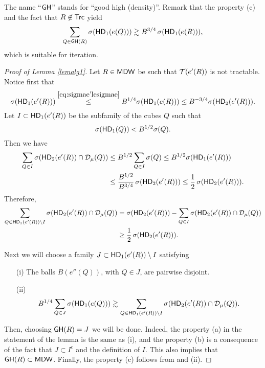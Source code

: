 The name ``${\mathsf{GH}}$'' stands for ``good high (density)''. Remark that the property (c) and the fact that $R\not\in{\mathsf{Trc}}$ yield
\begin{equation}\label{eqiter582}
\sum_{Q\in{\mathsf{GH}}(R)} \sigma({\mathsf{HD}}_1(e(Q))) \gtrsim B^{3/4}\,\sigma({\mathsf{HD}}_1(e(R))),
\end{equation}
which is suitable for iteration.

\begin{proof}[Proof of Lemma \ref{lemalg1}]
Let $R\in{\mathsf{MDW}}$ be such that ${\mathcal T}(e'(R))$ is not tractable. Notice first that
$$\sigma({\mathsf{HD}}_1(e'(R)))\overset{\eqref{eq:sigmae'lesigmae}}{\leq} B^{1/4}
\sigma({\mathsf{HD}}_1(e(R)))\leq B^{-3/4}\sigma({\mathsf{HD}}_2(e'(R))) .$$
Let $I\subset {\mathsf{HD}}_1(e'(R))$ be the subfamily of the cubes $Q$ such that
$$\sigma({\mathsf{HD}}_1(Q))< B^{1/2}\sigma(Q).$$
Then we have 
\begin{align*}
\sum_{Q\in I} \sigma({\mathsf{HD}}_2(e'(R))\cap{\mathcal D}_\mu(Q)) & \leq B^{1/2} \sum_{Q\in I} \sigma(Q)
\leq B^{1/2} \sigma({\mathsf{HD}}_1(e'(R))) \\
&\leq \frac{B^{1/2}}{B^{3/4}}\,\sigma({\mathsf{HD}}_2(e'(R)))\leq
 \frac12\,\sigma({\mathsf{HD}}_2(e'(R))).
\end{align*}
Therefore,
\begin{align}\label{eqdj723}
\sum_{Q\in {\mathsf{HD}}_1(e'(R))\setminus I} \sigma({\mathsf{HD}}_2(e'(R))\cap{\mathcal D}_\mu(Q)) & = \sigma({\mathsf{HD}}_2(e'(R))) -
\sum_{Q\in I} \sigma({\mathsf{HD}}_2(e'(R))\cap{\mathcal D}_\mu(Q))\\
& \geq \frac12\,\sigma({\mathsf{HD}}_2(e'(R))).\nonumber
\end{align}

Next we will choose a family $J\subset {\mathsf{HD}}_1(e'(R))\setminus I$ satisfying
\begin{itemize}
\item[(i)] The balls $B(e''(Q))$, with $Q\in J$, are pairwise disjoint.
\item[(ii)] $$B^{1/4}\sum_{Q\in J}\sigma({\mathsf{HD}}_1(e(Q)))
\gtrsim \sum_{Q\in {\mathsf{HD}}_1(e'(R))\setminus I} \sigma({\mathsf{HD}}_2(e'(R))\cap{\mathcal D}_\mu(Q)).$$
\end{itemize}
Then, choosing ${\mathsf{GH}}(R) = J$ we will be done. Indeed, the  property (a) in the statement of the lemma is the same as (i), and the property (b) is a consequence of the fact that
$J\subset I^c$ and the definition of $I$. This also implies that ${\mathsf{GH}}(R)\subset{\mathsf{MDW}}$. Finally, the property (c) follows from  and (ii).



\end{proof}
